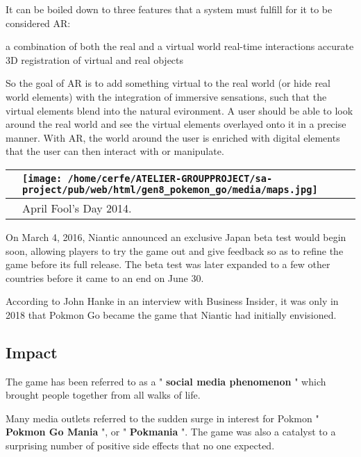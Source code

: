 \documentclass[a4paper,10pt]{book}
\begin{document}
 
      It can be boiled down to three features that a system must fulfill for it to be considered AR:
       
 
 a combination of both the real and a virtual world 
 real-time interactions 
 accurate 3D registration of virtual and real objects 
 
 
          So the goal of AR is to add something virtual to the real world (or hide real world elements) with the integration of immersive sensations,
          such that the virtual elements blend into the natural evironment. A user should be able to look around the real world and see the virtual elements overlayed onto it in a precise manner.
          With AR, the world around the user is enriched with digital elements that the user can then interact with or manipulate.
         
 \begin{longtable}{p{1mm}|l|}\hline
 
 & \texttt{[image: /home/cerfe/ATELIER-GROUPPROJECT/sa-project/pub/web/html/gen8\_pokemon\_go/media/maps.jpg]}
 \\\hline
 
 & April Fool's Day 2014. 
 \\\hline
 \end{longtable}
 
        On March 4, 2016, Niantic announced an exclusive Japan beta test would begin soon, allowing players to try the game out and give feedback so as to refine the game before its full release.
        The beta test was later expanded to a few other countries before it came to an end on June 30.
       
 
        According to John Hanke in an interview with Business Insider, it was only in 2018 that Pokmon Go became the game that Niantic had initially envisioned.
       
 
 \subsection{Impact }
 
        The game has been referred to as a " \textbf{social media phenomenon } " which brought people together from all walks of life.
         
        Many media outlets referred to the sudden surge in interest for Pokmon " \textbf{Pokmon Go Mania } ", or " \textbf{Pokmania } ".
        The game was also a catalyst to a surprising number of positive side effects that no one expected.
       
\end{document}
